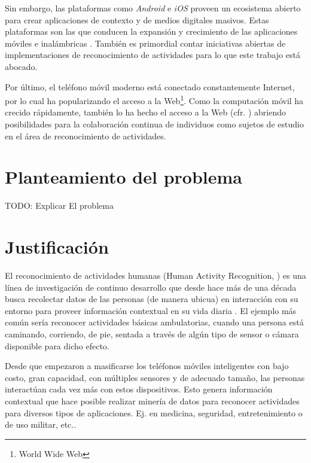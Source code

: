 Sin embargo, las plataformas como \emph{Android} \cite{google2005and}
e\emph{ iOS} \cite{apple2007ios}
proveen un ecosistema abierto para crear aplicaciones de contexto
y de medios digitales masivos. Estas plataformas son las que conducen
la expansión y crecimiento de las aplicaciones móviles e inalámbricas
\cite{Tanenbaum2010}. También es primordial contar iniciativas abiertas
de implementaciones de reconocimiento de actividades para lo que este
trabajo está abocado.

Por último, el teléfono móvil moderno está conectado constantemente
Internet, por lo cual ha popularizando el acceso a la Web\footnote{World Wide Web}.
Como la computación móvil ha crecido rápidamente, también lo ha hecho
el acceso a la Web (cfr. \cite{nyt2008iph}) abriendo posibilidades
para la colaboración continua de individuos como sujetos de estudio
en el área de reconocimiento de actividades.

\section{Planteamiento del problema}

\label{planteamiento}

TODO: Explicar El problema

\section{Justificación\label{justificaciuxf3n}}

El reconocimiento de actividades humanas (Human Activity Recognition,
)
es una línea de investigación de continuo desarrollo que desde hace
más de una década busca recolectar datos de las personas (de manera
ubicua) en interacción con su entorno para proveer información contextual
en su vida diaria \cite{Bao2004}. El ejemplo más común sería reconocer
actividades básicas ambulatorias, cuando una persona está caminando,
corriendo, de pie, sentada a través de algún tipo de sensor o cámara
disponible para dicho efecto.

Desde que empezaron a masificarse los teléfonos móviles inteligentes
con bajo costo, gran capacidad, con múltiples sensores y de adecuado
tamaño, las personas interactúan cada vez más con estos dispositivos.
Esto genera información contextual que hace posible realizar minería
de datos para reconocer actividades para diversos tipos de aplicaciones.
Ej. en medicina, seguridad, entretenimiento o de uso militar, etc.\cite{LaraLabrador2013}.

